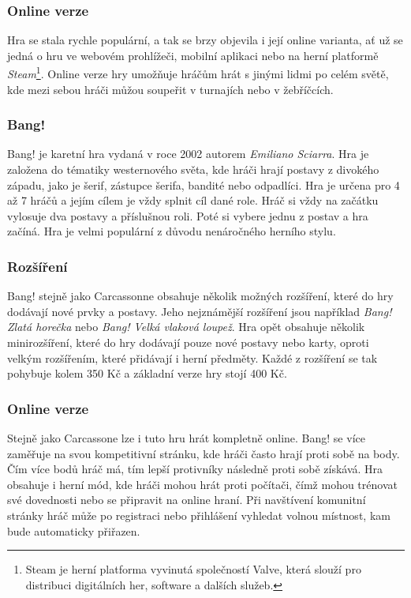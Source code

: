 \subsubsection*{Online verze}
\label{subsubsec:popular-board-games-analysis-carcassonne-online}
Hra se stala rychle populární, a tak se brzy objevila i její online varianta, ať už se jedná o hru ve webovém prohlížeči, mobilní aplikaci nebo na herní platformě \textit{Steam}\footnote{Steam je herní platforma vyvinutá společností Valve, která slouží pro distribuci digitálních her, software a dalších služeb.}. Online verze hry umožňuje hráčům hrát s jinými lidmi po celém světě, kde mezi sebou hráči můžou soupeřit v turnajích nebo v žebříčcích.

\subsubsection{Bang!}
\label{subsubsec:popular-board-games-analysis-bang}
Bang! je karetní hra vydaná v roce 2002 autorem \textit{Emiliano Sciarra}. Hra je založena do tématiky westernového světa, kde hráči hrají postavy z divokého západu, jako je šerif, zástupce šerifa, bandité nebo odpadlíci. Hra je určena pro 4 až 7 hráčů a jejím cílem je vždy splnit cíl dané role. Hráč si vždy na začátku vylosuje dva postavy a příslušnou roli. Poté si vybere jednu z postav a hra začíná. Hra je velmi populární z důvodu nenáročného herního stylu.

\subsubsection*{Rozšíření}
\label{subsubsec:popular-board-games-analysis-bang-expansions}
Bang! stejně jako Carcassonne obsahuje několik možných rozšíření, které do hry dodávají nové prvky a postavy. Jeho nejznámější rozšíření jsou například \textit{Bang! Zlatá horečka} nebo \textit{Bang! Velká vlaková loupež}. Hra opět obsahuje několik minirozšíření, které do hry dodávají pouze nové postavy nebo karty, oproti velkým rozšířením, které přidávají i herní předměty. Každé z rozšíření se tak pohybuje kolem 350 Kč a základní verze hry stojí 400 Kč.

\subsubsection*{Online verze}
\label{subsubsec:popular-board-games-analysis-bang-online}
Stejně jako Carcassone lze i tuto hru hrát kompletně online. Bang! se více zaměřuje na svou kompetitivní stránku, kde hráči často hrají proti sobě na body. Čím více bodů hráč má, tím lepší protivníky následně proti sobě získává. Hra obsahuje i herní mód, kde hráči mohou hrát proti počítači, čímž mohou trénovat své dovednosti nebo se připravit na online hraní. Při navštívení komunitní stránky hráč může po registraci nebo přihlášení vyhledat volnou místnost, kam bude automaticky přiřazen.

